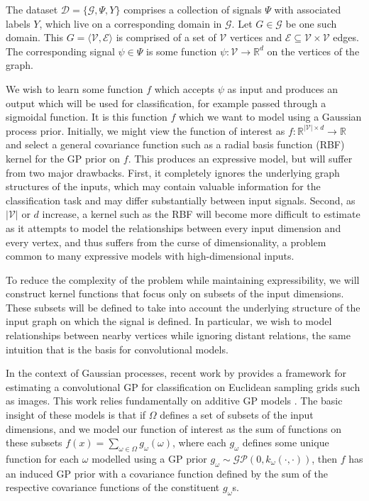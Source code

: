 \documentclass{article}
\begin{document}
The dataset $\mathcal{D}=\{\mathcal{G}, \Psi,Y\}$ comprises a collection of signals $\Psi$ with associated labels $Y$, which live on a corresponding domain in $\mathcal{G}$. Let $G \in \mathcal{G}$ be one such domain. This $G = \langle\mathcal{V},\mathcal{E}\rangle$ is comprised of a set of $\mathcal{V}$ vertices and $\mathcal{E} \subseteq \mathcal{V} \times \mathcal{V}$ edges. The corresponding signal $\psi \in \Psi$ is some function $\psi: \mathcal{V} \rightarrow \mathbb{R}^d$ on the vertices of the graph.

We wish to learn some function $f$ which accepts $\psi$ as input and produces an output which will be used for classification, for example passed through a sigmoidal function. It is this function $f$ which we want to model using a Gaussian process prior. Initially, we might view the function of interest as $f: \mathbb{R}^{|\mathcal{V}| \times d} \rightarrow \mathbb{R}$ and select a general covariance function such as a radial basis function (RBF) kernel for the GP prior on $f$. This produces an expressive model, but will suffer from two major drawbacks. First, it completely ignores the underlying graph structures of the inputs, which may contain valuable information for the classification task and may differ substantially between input signals. Second, as $|\mathcal{V}|$ or $d$ increase, a kernel such as the RBF will become more difficult to estimate as it attempts to model the relationships between every input dimension and every vertex, and thus suffers from the curse of dimensionality, a problem common to many expressive models with high-dimensional inputs.

To reduce the complexity of the problem while maintaining expressibility, we will construct kernel functions that focus only on subsets of the input dimensions. These subsets will be defined to take into account the underlying structure of the input graph on which the signal is defined. In particular, we wish to model relationships between nearby vertices while ignoring distant relations, the same intuition that is the basis for convolutional models.

In the context of Gaussian processes, recent work by \citet{convgp} provides a framework for estimating a convolutional GP for classification on Euclidean sampling grids such as images. This work relies fundamentally on additive GP models \citep{duvenaud2011additive11}. The basic insight of these models is that if $\Omega$ defines a set of subsets of the input dimensions, and we model our function of interest as the sum of functions on these subsets $f(x) = \sum_{\omega \in \Omega} g_\omega (\omega)$, where each $g_\omega$ defines some unique function for each $\omega$ modelled using a GP prior $g_\omega \sim \mathcal{GP}(0,k_\omega(\cdot,\cdot))$, then $f$ has an induced GP prior with a covariance function defined by the sum of the respective covariance functions of the constituent $g_\omega$s.
\end{document}
